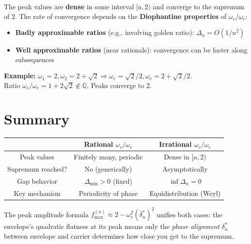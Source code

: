 \documentclass[12pt]{article}
\theoremstyle{definition}
\theoremstyle{remark}
\begin{document}
\begin{tcolorbox}[colback=green!5, colframe=green!50!black, title=Irrational Case]
The peak values are \textbf{dense} in some interval $[a, 2)$ and converge to the supremum of $2$. The rate of convergence depends on the \textbf{Diophantine properties} of $\omega_c/\omega_e$:
\begin{itemize}
\item \textbf{Badly approximable ratios} (e.g., involving golden ratio): $\Delta_n = O(1/n^2)$
\item \textbf{Well approximable ratios} (near rationals): convergence can be faster along subsequences
\end{itemize}
\end{tcolorbox}

\textbf{Example:} $\omega_1=2, \omega_2=2+\sqrt{2} \Rightarrow \omega_e=\sqrt{2}/2, \omega_c=2+\sqrt{2}/2$.\\
Ratio $\omega_c/\omega_e = 1 + 2\sqrt{2} \notin \mathbb{Q}$. Peaks converge to $2$.

\section{Summary}

\begin{center}
\renewcommand{\arraystretch}{1.5}
\begin{tabular}{|c|c|c|}
\hline
 & \textbf{Rational} $\omega_c/\omega_e$ & \textbf{Irrational} $\omega_c/\omega_e$ \\
\hline
Peak values & Finitely many, periodic & Dense in $[a,2)$ \\
\hline
Supremum reached? & No (generically) & Asymptotically \\
\hline
Gap behavior & $\Delta_{\min} > 0$ (fixed) & $\inf \Delta_n = 0$ \\
\hline
Key mechanism & Periodicity of phase & Equidistribution (Weyl) \\
\hline
\end{tabular}
\end{center}

\bigskip
The peak amplitude formula $f_{\max}^{(n)} \approx 2 - \omega_e^2(\delta_n^*)^2$ unifies both cases: the envelope's quadratic flatness at its peak means only the \emph{phase alignment} $\delta_n^*$ between envelope and carrier determines how close you get to the supremum.
\end{document}
